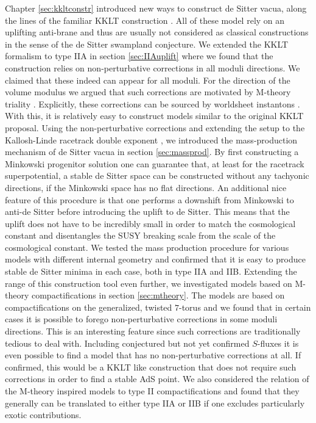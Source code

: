 \documentclass[a4paper,12pt]{report}
\begin{document}
Chapter \ref{sec:kkltconstr} introduced new ways to construct de Sitter vacua, along the lines of the familiar KKLT construction \cite{Cribiori:2019bfx,Kallosh:2019zgd,Cribiori:2019drf,Cribiori:2019hrb}. All of these model rely on an uplifting anti-brane and thus are usually not considered as classical constructions in the sense of the de Sitter swampland conjecture. We extended the KKLT formalism to type IIA in section \ref{sec:IIAuplift} where we found that the construction relies on non-perturbative corrections in all moduli directions. We claimed that these indeed can appear \cite{Palti:2008mg} for all moduli. For the direction of the volume modulus we argued that such corrections are motivated by M-theory triality \cite{Hull:1994ys,Schwarz:1996bh,Acharya:2007rc}. Explicitly, these corrections can be sourced by worldsheet instantons \cite{Kachru:2000ih,Blumenhagen:2009qh}. With this, it is relatively easy to construct models similar to the original KKLT proposal. Using the non-perturbative corrections and extending the setup to the Kallosh-Linde racetrack double exponent \cite{Kallosh:2004yh}, we introduced the mass-production mechanism of de Sitter vacua in section \ref{sec:massprod}. By first constructing a Minkowski progenitor solution one can guarantee that, at least for the racetrack superpotential, a stable de Sitter space can be constructed without any tachyonic directions, if the Minkowski space has no flat directions. An additional nice feature of this procedure is that one performs a downshift from Minkowski to anti-de Sitter before introducing the uplift to de Sitter. This means that the uplift does not have to be incredibly small in order to match the cosmological constant and disentangles the SUSY breaking scale from the scale of the cosmological constant. We tested the mass production procedure for various models with different internal geometry and confirmed that it is easy to produce stable de Sitter minima in each case, both in type IIA and IIB. Extending the range of this construction tool even further, we investigated models based on M-theory compactifications in section \ref{sec:mtheory}. The models are based on compactifications on the generalized, twisted $7$-torus \cite{DallAgata:2005zlf,Duff:2010vy,Derendinger:2014wwa,Ferrara:2016fwe} and we found that in certain cases it is possible to forego non-perturbative corrections in some moduli directions. This is an interesting feature since such corrections are traditionally tedious to deal with. Including conjectured but not yet confirmed $S$-fluxes it is even possible to find a model that has no non-perturbative corrections at all. If confirmed, this would be a KKLT like construction that does not require such corrections in order to find a stable AdS point. We also considered the relation of the M-theory inspired models to type II compactifications and found that they generally can be translated to either type IIA or IIB if one excludes particularly exotic contributions.\\
\end{document}
